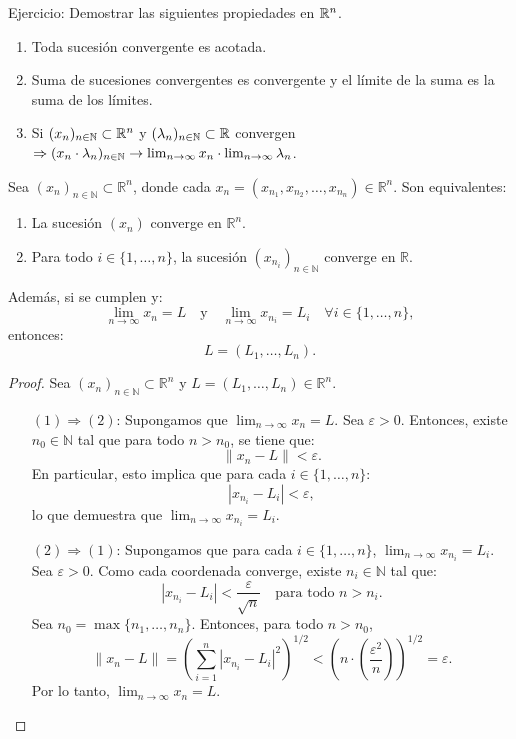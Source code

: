 \begin{prop}
  Ejercicio: Demostrar las siguientes propiedades en \(\mathbb{R}^n\).
  \begin{enumerate}
    \item Toda sucesión convergente es acotada.
    \item Suma de sucesiones convergentes es convergente y el límite de la suma es la suma de los límites.
    \item Si \((x_n)_{n \in \mathbb{N}} \subset \mathbb{R}^n\) y \((\lambda_n)_{n \in \mathbb{N}} \subset \mathbb{R}\) convergen \(\Rightarrow (x_n \cdot \lambda_n)_{n \in \mathbb{N}} \to \lim_{n \to \infty} x_n \cdot \lim_{n \to \infty} \lambda_n\).
  \end{enumerate}
\end{prop}

\begin{prop}
  Sea \((x_n)_{n \in \mathbb{N}} \subset \mathbb{R}^n\), donde cada \(x_n = (x_{n_1}, x_{n_2}, \ldots, x_{n_n}) \in \mathbb{R}^n\). Son equivalentes:
  \begin{enumerate}
    \item La sucesión \((x_n)\) converge en \(\mathbb{R}^n\).
    \item Para todo \(i \in \{1, \ldots, n\}\), la sucesión \((x_{n_i})_{n \in \mathbb{N}}\) converge en \(\mathbb{R}\).
  \end{enumerate}
  Además, si se cumplen y:
  \[
    \lim_{n \to \infty} x_n = L \quad \text{y} \quad \lim_{n \to \infty} x_{n_i} = L_i \quad \forall i \in \{1, \ldots, n\},
  \]
  entonces:
  \[
    L = (L_1, \ldots, L_n).
  \]
  \begin{proof}
    Sea \((x_n)_{n \in \mathbb{N}} \subset \mathbb{R}^n\) y \(L = (L_1, \ldots, L_n) \in \mathbb{R}^n\).
    \begin{enumerate}
      \item[\((1) \Rightarrow (2)\):] Supongamos que \(\lim_{n \to \infty} x_n = L\). Sea \(\varepsilon > 0\). Entonces, existe \(n_0 \in \mathbb{N}\) tal que para todo \(n > n_0\), se tiene que:
            \[
              \|x_n - L\| < \varepsilon.
            \]
            En particular, esto implica que para cada \(i \in \{1, \ldots, n\}\):
            \[
              |x_{n_i} - L_i| < \varepsilon,
            \]
            lo que demuestra que \(\lim_{n \to \infty} x_{n_i} = L_i\).

      \item[\((2) \Rightarrow (1)\):] Supongamos que para cada \(i \in \{1, \ldots, n\}\), \(\lim_{n \to \infty} x_{n_i} = L_i\). Sea \(\varepsilon > 0\). Como cada coordenada converge, existe \(n_i \in \mathbb{N}\) tal que:
            \[
              |x_{n_i} - L_i| < \frac{\varepsilon}{\sqrt{n}} \quad \text{para todo } n > n_i.
            \]
            Sea \(n_0 = \max\{n_1, \ldots, n_n\}\). Entonces, para todo \(n > n_0\),
            \[
              \|x_n - L\| = \left( \sum_{i=1}^n |x_{n_i} - L_i|^2 \right)^{1/2} < \left( n \cdot \left( \frac{\varepsilon^2}{n} \right) \right)^{1/2} = \varepsilon.
            \]
            Por lo tanto, \(\lim_{n \to \infty} x_n = L\).
    \end{enumerate}
  \end{proof}
\end{prop}

